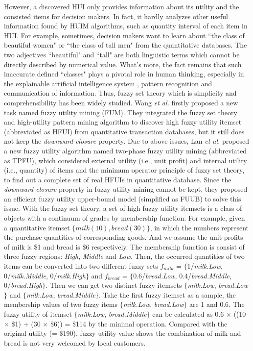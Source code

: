 \documentclass[journal]{IEEEtran}
\begin{document}
However, a discovered HUI only provides information about its utility and the consisted items for decision makers. In fact, it hardly analyzes other useful information found by HUIM algorithms, such as quantity interval of each item in HUI. For example, sometimes, decision makers want to learn about ``the class of beautiful women" or ``the class of tall men" from the quantitative databases. The two adjectives ``beautiful" and ``tall" are both linguistic terms which cannot be directly described by numerical value. What's more, the fact remains that such inaccurate defined ``classes" plays a pivotal role in human thinking, especially in the explainable artificial intelligence system \cite{dovsilovic2018explainable}, pattern recognition and communication of information. Thus, fuzzy set theory \cite{zadeh1965fuzzy} which is simplicity and comprehensibility has been widely studied. Wang \textit{et al.} \cite{wang2009fuzzy} firstly proposed a new task named fuzzy utility mining (FUM). They integrated the fuzzy set theory and high-utility pattern mining algorithm to discover high fuzzy utility itemset (abbreviated as HFUI) from quantitative transaction databases, but it still does not keep the \textit{downward-closure} property. Due to above issues, Lan \textit{et al.} \cite{lan2015fuzzy} proposed a new fuzzy utility algorithm named two-phase fuzzy utility mining (abbreviated as TPFU), which considered external utility (i.e., unit profit) and internal utility (i.e., quantity) of items and the minimum operator principle of fuzzy set theory, to find out a complete set of real HFUIs in quantitative database. Since the \textit{downward-closure} property in fuzzy utility mining cannot be kept, they proposed an efficient fuzzy utility upper-bound model (simplified as FUUB) to solve this issue. With the fuzzy set theory, a set of high fuzzy utility itemsets is a class of objects with a continuum of grades by membership function. For example, given a quantitative itemset $\{milk(10), bread(30)\}$, in which the numbers represent the purchase quantities of corresponding goods. And we assume the unit profits of milk is \$1 and bread is \$6 respectively. The membership function is consist of three fuzzy regions: \textit{High}, \textit{Middle} and \textit{Low}. Then, the occurred quantities of two items can be converted into two different fuzzy sets $f_{milk}$ = $\{$1/\textit{milk.Low}, 0/\textit{milk.Middle}, 0/\textit{milk.High}$\}$ and $f_{bread}$ = $\{$0.6/\textit{bread.Low}, 0.4/\textit{bread.Middle}, 0/\textit{bread.High}$\}$. Then we can get two distinct fuzzy itemsets $\{$\textit{milk.Low}, \textit{bread.Low}$\}$ and $\{$\textit{milk.Low}, \textit{bread.Middle}$\}$. Take the first fuzzy itemset as a sample, the membership values of two fuzzy items $\{$\textit{milk.Low}, \textit{bread.Low}$\}$ are 1 and 0.6. The fuzzy utility of itemset $\{$\textit{milk.Low}, \textit{bread.Middle}$\}$ can be calculated as 0.6 $\times$ ((10 $\times$ \$1) + (30 $\times$ \$6)) = \$114 by the minimal operation. Compared with the original utility (= \$190), fuzzy utility value shows the combination of milk and bread is not very welcomed by local customers.
\end{document}

